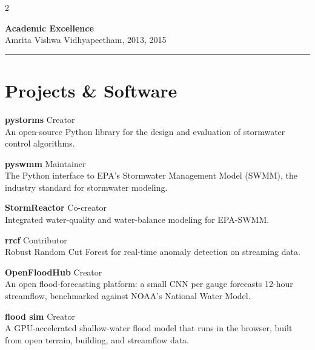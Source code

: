 \documentclass{article}
\newcommand{\divider}{\textcolor{tuftegray}{\rule{\linewidth}{0.5pt}}}
\begin{document}
\begin{paracol}{2}
\begin{flushleft}
\textbf{Academic Excellence}\\
{\small\textcolor{tuftegray}{Amrita Vishwa Vidhyapeetham, 2013, 2015}}
\vspace{1em}
\divider
\vspace{1em}

\section{Projects \& Software}
\textbf{pystorms} \hfill \textcolor{tuftegray}{Creator}\\
{\small An open-source Python library for the design and evaluation of stormwater control algorithms.}
\vspace{0.5em}

\textbf{pyswmm} \hfill \textcolor{tuftegray}{Maintainer}\\
{\small The Python interface to EPA's Stormwater Management Model (SWMM), the industry standard for stormwater modeling.}
\vspace{0.5em}

\textbf{StormReactor} \hfill \textcolor{tuftegray}{Co-creator}\\
{\small Integrated water-quality and water-balance modeling for EPA-SWMM.}
\vspace{0.5em}

\textbf{rrcf} \hfill \textcolor{tuftegray}{Contributor}\\
{\small Robust Random Cut Forest for real-time anomaly detection on streaming data.}
\vspace{0.5em}

\textbf{OpenFloodHub} \hfill \textcolor{tuftegray}{Creator}\\
{\small An open flood-forecasting platform: a small CNN per gauge forecasts 12-hour streamflow, benchmarked against NOAA's National Water Model.}
\vspace{0.5em}

\textbf{flood sim} \hfill \textcolor{tuftegray}{Creator}\\
{\small A GPU-accelerated shallow-water flood model that runs in the browser, built from open terrain, building, and streamflow data.}




\end{flushleft}
\end{paracol}
\end{document}
